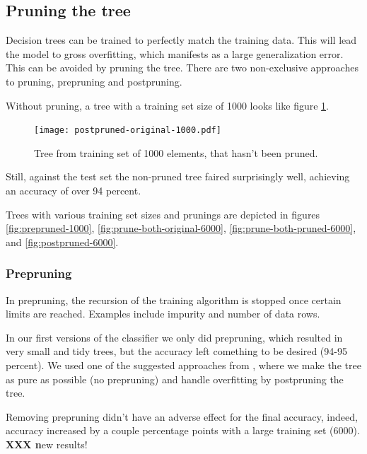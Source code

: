 \documentclass[a4paper,10pt]{article}
\newcommand{\XXX}[1]{{\bf XXX #1}}
\begin{document}
\subsection{Pruning the tree}

Decision trees can be trained to perfectly match the training
data\cite[p. 182]{alpaydin2004}.  This will lead the model to
gross overfitting, which manifests as a large generalization error.
This can be avoided by pruning the tree.  There are two non-exclusive
approaches to pruning, prepruning and postpruning.

Without pruning, a tree with a training set size of 1000 looks like
figure \ref{fig:no-pruning-1000}.

\begin{figure}[h]
  \centering
  \begin{minipage}[c]{1.0\textwidth}
    \centering
\texttt{[image: postpruned-original-1000.pdf]}
  \end{minipage}
  \caption{Tree from training set of 1000 elements, that hasn't been
    pruned.}
  \label{fig:no-pruning-1000}
\end{figure}

Still, against the test set the non-pruned tree faired surprisingly
well, achieving an accuracy of over 94 percent.

Trees with various training set sizes and prunings are depicted in
figures \ref{fig:prepruned-1000}, \ref{fig:prune-both-original-6000},
\ref{fig:prune-both-pruned-6000}, and \ref{fig:postpruned-6000}.

\subsubsection{Prepruning}

In prepruning, the recursion of the training algorithm is stopped once
certain limits are reached.  Examples include impurity and number of
data rows.

In our first versions of the classifier we only did prepruning, which
resulted in very small and tidy trees, but the accuracy left comething
to be desired (94-95 percent).  We used one of the suggested
approaches from \cite{alpaydin2004}, where we make the tree as pure as
possible (no prepruning) and handle overfitting by postpruning the tree.

Removing prepruning didn't have an adverse effect for the final
accuracy, indeed, accuracy increased by a couple percentage points with
a large training set (6000). {\XXX new results!}
\end{document}
